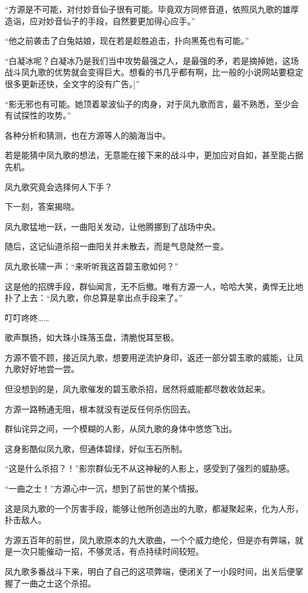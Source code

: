 \begin{this_body}
“方源是不可能，对付妙音仙子很有可能。毕竟双方同修音道，依照凤九歌的雄厚造诣，应对妙音仙子的手段，自然要更加得心应手。”

“他之前袭击了白兔姑娘，现在若是趁胜追击，扑向黑菟也有可能。”

“白凝冰呢？白凝冰乃是我们当中攻势最强之人，是最强的矛，若是摘掉她，这场战斗凤九歌的优势就会变得巨大。想看的书几乎都有啊，比一般的小说网站要稳定很多更新还快，全文字的没有广告。]”

“影无邪也有可能。她顶着翠波仙子的肉身，对于凤九歌而言，最不熟悉，至少会有试探性的攻势。”

各种分析和猜测，也在方源等人的脑海当中。

若是能猜中凤九歌的想法，无意能在接下来的战斗中，更加应对自如，甚至能占据先机。

凤九歌究竟会选择何人下手？

下一刻，答案揭晓。

凤九歌猛地一跃，一曲阳关发动，让他腾挪到了战场中央。

随后，这记仙道杀招一曲阳关并未散去，而是气息陡然一变。

凤九歌长啸一声：“来听听我这首碧玉歌如何？”

这是他的招牌手段，群仙闻言，无不后撤。唯有方源一人，哈哈大笑，勇悍无比地扑了上去：“凤九歌，你总算是拿出点手段来了。”

叮叮咚咚……

歌声飘扬，如大珠小珠落玉盘，清脆悦耳至极。

方源不管不顾，接近凤九歌，想要用逆流护身印，返还一部分碧玉歌的威能，让凤九歌好好地尝一尝。

但没想到的是，凤九歌催发的碧玉歌杀招，居然将威能都尽数收敛起来。

方源一路畅通无阻，根本就没有逆反任何杀伤回去。

群仙诧异之间，一个模糊的人影，从凤九歌的身体中悠悠飞出。

这身影酷似凤九歌，但通体碧绿，好似玉石所制。

“这是什么杀招？！”影宗群仙无不从这神秘的人影上，感受到了强烈的威胁感。

“一曲之士！”方源心中一沉，想到了前世的某个情报。

这是凤九歌的一个厉害手段，能够让他所创造出的九歌，都凝聚起来，化为人形，扑击敌人。

方源五百年的前世，凤九歌原本的九大歌曲，一个个威力绝伦，但是亦有弊端，就是一次只能催动一招，不够灵活，有点持续时间较短。

凤九歌多番战斗下来，明白了自己的这项弊端，便闭关了一小段时间，出关后便掌握了一曲之士这个杀招。


\end{this_body}
